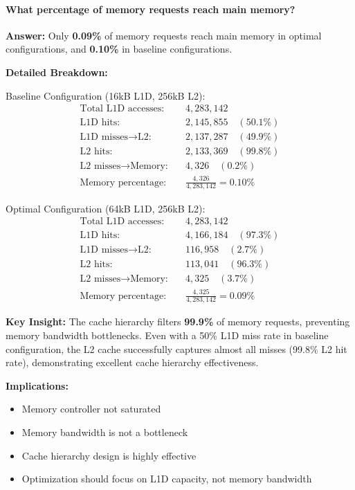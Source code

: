 \documentclass[11pt,a4paper]{article}
\begin{document}
\paragraph{What percentage of memory requests reach main memory?}

\textbf{Answer:} Only \textbf{0.09\%} of memory requests reach main memory in optimal configurations, and \textbf{0.10\%} in baseline configurations.

\textbf{Detailed Breakdown:}

Baseline Configuration (16kB L1D, 256kB L2):
\begin{align*}
\text{Total L1D accesses:} &\quad 4,283,142 \\
\text{L1D hits:} &\quad 2,145,855 \quad (50.1\%) \\
\text{L1D misses} \rightarrow \text{L2:} &\quad 2,137,287 \quad (49.9\%) \\
\text{L2 hits:} &\quad 2,133,369 \quad (99.8\%) \\
\text{L2 misses} \rightarrow \text{Memory:} &\quad 4,326 \quad (0.2\%) \\
\text{Memory percentage:} &\quad \frac{4,326}{4,283,142} = 0.10\%
\end{align*}

Optimal Configuration (64kB L1D, 256kB L2):
\begin{align*}
\text{Total L1D accesses:} &\quad 4,283,142 \\
\text{L1D hits:} &\quad 4,166,184 \quad (97.3\%) \\
\text{L1D misses} \rightarrow \text{L2:} &\quad 116,958 \quad (2.7\%) \\
\text{L2 hits:} &\quad 113,041 \quad (96.3\%) \\
\text{L2 misses} \rightarrow \text{Memory:} &\quad 4,325 \quad (3.7\%) \\
\text{Memory percentage:} &\quad \frac{4,325}{4,283,142} = 0.09\%
\end{align*}

\textbf{Key Insight:} The cache hierarchy filters \textbf{99.9\%} of memory requests, preventing memory bandwidth bottlenecks. Even with a 50\% L1D miss rate in baseline configuration, the L2 cache successfully captures almost all misses (99.8\% L2 hit rate), demonstrating excellent cache hierarchy effectiveness.

\textbf{Implications:}
\begin{itemize}[noitemsep]
    \item Memory controller not saturated
    \item Memory bandwidth is not a bottleneck
    \item Cache hierarchy design is highly effective
    \item Optimization should focus on L1D capacity, not memory bandwidth
\end{itemize}
\end{document}
